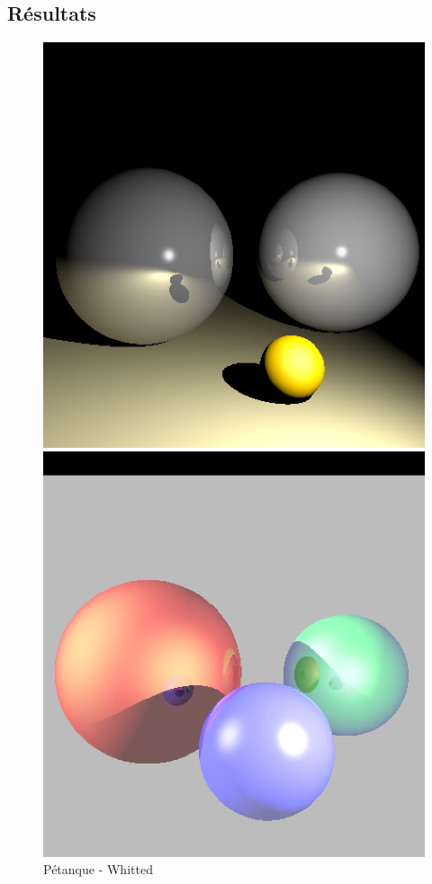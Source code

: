 \documentclass{article}
\begin{document}
\subsection*{Résultats}
\begin{figure}[htb!]
\centering
\begin{minipage}{.45\textwidth}
  \centering
  \includegraphics[width=\linewidth]{results/petanque_whitted.png}
  \caption{Pétanque - Whitted}
  \label{fig:tsnormal}
\end{minipage}\hfill
\begin{minipage}{.45\textwidth}
  \centering
  \includegraphics[width=\linewidth]{results/troisSpheres_whitted.png}

\end{minipage}
\end{figure}
\end{document}
